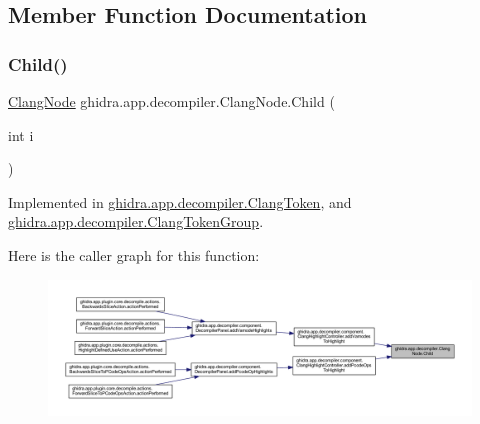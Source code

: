 \subsection{Member Function Documentation}
\mbox{\label{interfaceghidra_1_1app_1_1decompiler_1_1_clang_node_a7bf351bf5951fb71a5c55fdb311736be}} 
\subsubsection{\texorpdfstring{Child()}{Child()}}
{\footnotesize\ttfamily \mbox{\hyperlink{interfaceghidra_1_1app_1_1decompiler_1_1_clang_node}{Clang\+Node}} ghidra.\+app.\+decompiler.\+Clang\+Node.\+Child (\begin{DoxyParamCaption}\item[{int}]{i }\end{DoxyParamCaption})}



Implemented in \mbox{\hyperlink{classghidra_1_1app_1_1decompiler_1_1_clang_token_a1a334ac11609a6a1d53d0faca1157d2f}{ghidra.\+app.\+decompiler.\+Clang\+Token}}, and \mbox{\hyperlink{classghidra_1_1app_1_1decompiler_1_1_clang_token_group_a46fb87fe558080bdc0dd85072e915e90}{ghidra.\+app.\+decompiler.\+Clang\+Token\+Group}}.

Here is the caller graph for this function\+:
\nopagebreak
\begin{figure}[H]
\begin{center}
\leavevmode
\includegraphics[width=350pt]{interfaceghidra_1_1app_1_1decompiler_1_1_clang_node_a7bf351bf5951fb71a5c55fdb311736be_icgraph}
\end{center}
\end{figure}
\mbox{\label{interfaceghidra_1_1app_1_1decompiler_1_1_clang_node_a0283101b063f37008afb65626cb21f74}} 
